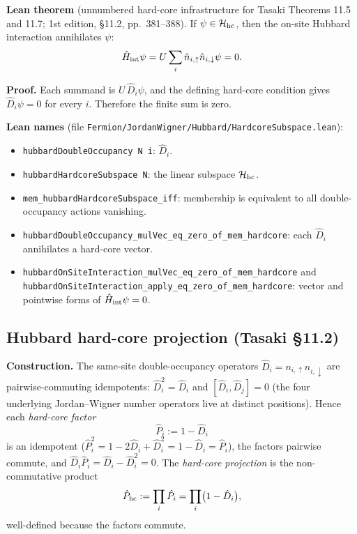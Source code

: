 \documentclass[a4paper,11pt]{article}
\begin{document}
\noindent\textbf{Lean theorem} (unnumbered hard-core infrastructure for
Tasaki Theorems 11.5 and 11.7; 1st edition, §11.2, pp.~381--388).
If \(\psi \in \mathcal H_{\rm hc}\), then the on-site Hubbard
interaction annihilates \(\psi\):
\[
  \hat H_{\rm int}\psi
  =
  U\sum_i \hat n_{i,\uparrow}\hat n_{i,\downarrow}\psi
  =
  0.
\]

\noindent\textbf{Proof.}
Each summand is \(U\,\hat D_i\psi\), and the defining hard-core
condition gives \(\hat D_i\psi=0\) for every \(i\). Therefore the
finite sum is zero.

\noindent\textbf{Lean names}
(file \texttt{Fermion/JordanWigner/Hubbard/HardcoreSubspace.lean}):
\begin{itemize}
  \item \texttt{hubbardDoubleOccupancy N i}: \(\hat D_i\).
  \item \texttt{hubbardHardcoreSubspace N}: the linear subspace
    \(\mathcal H_{\rm hc}\).
  \item \texttt{mem\_hubbardHardcoreSubspace\_iff}: membership is
    equivalent to all double-occupancy actions vanishing.
  \item \texttt{hubbardDoubleOccupancy\_mulVec\_eq\_zero\_of\_mem\_hardcore}:
    each \(\hat D_i\) annihilates a hard-core vector.
  \item \texttt{hubbardOnSiteInteraction\_mulVec\_eq\_zero\_of\_mem\_hardcore}
    and
    \texttt{hubbardOnSiteInteraction\_apply\_eq\_zero\_of\_mem\_hardcore}:
    vector and pointwise forms of \(\hat H_{\rm int}\psi=0\).
\end{itemize}

\subsection{Hubbard hard-core projection (Tasaki §11.2)}
\label{subsec:hubbard-hardcore-projection}

\noindent\textbf{Construction.}
The same-site double-occupancy operators
\(\hat D_i = n_{i,\uparrow}n_{i,\downarrow}\) are pairwise-commuting
idempotents: \(\hat D_i^2 = \hat D_i\) and
\([\hat D_i,\hat D_j]=0\) (the four underlying Jordan--Wigner number
operators live at distinct positions). Hence each
\emph{hard-core factor}
\[
  \hat P_i := 1 - \hat D_i
\]
is an idempotent (\(\hat P_i^2 = 1 - 2\hat D_i + \hat D_i^2
= 1 - \hat D_i = \hat P_i\)), the factors pairwise commute, and
\(\hat D_i\hat P_i = \hat D_i - \hat D_i^2 = 0\). The
\emph{hard-core projection} is the non-commutative product
\[
  \hat P_{\rm hc} := \prod_{i} \hat P_i = \prod_{i}\bigl(1 - \hat D_i\bigr),
\]
well-defined because the factors commute.
\end{document}
